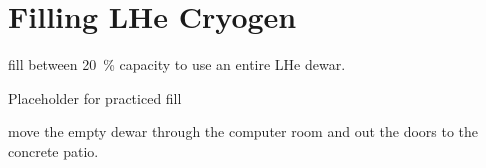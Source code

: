 \section{Filling LHe Cryogen}
\label{sec:op_maintenance:filling_lhe}
\begin{pleasedo} fill between 20~\% capacity to use an entire LHe dewar. \end{pleasedo}
\FIXME Placeholder for practiced fill
\begin{pleasedo} move the empty dewar through the computer room and out the doors to the concrete patio. \end{pleasedo}


